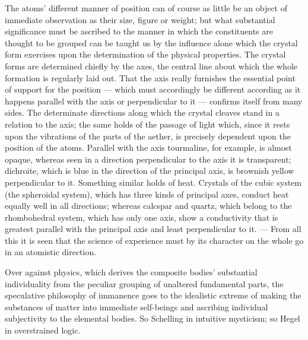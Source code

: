 \documentclass[12pt,a4paper]{book}
\begin{document}
The atoms' different manner of position can of course as little be an object of immediate observation as their size,
figure or weight; but what substantial significance must be ascribed to the manner in which the constituents are
thought to be grouped can be taught us by the influence alone which the crystal form exercises upon the determination
of the physical properties. The crystal forms are determined chiefly by the axes, the central line about which the
whole formation is regularly laid out. That the axis really furnishes the essential point of support for the position
--- which must accordingly be different according as it happens parallel with the axis or perpendicular to it ---
confirms itself from many sides. The determinate directions along which the crystal cleaves stand in a relation to the
axis; the same holds of the passage of light which, since it rests upon the vibrations of the parts of the aether, is
precisely dependent upon
the position of the atoms. Parallel with the axis tourmaline, for example, is almost opaque, whereas seen in a
direction perpendicular to the axis it is transparent; dichroite, which is blue in the direction of the principal
axis, is brownish yellow perpendicular to it. Something similar holds of heat. Crystals of the cubic system (the
spheroidal system), which has three kinds of principal axes, conduct heat equally well in all directions; whereas
calcspar and quartz, which belong to the rhombohedral system, which has only one axis, show a conductivity that is
greatest parallel with the principal axis and least perpendicular to it. --- From all this it is seen that the science
of experience must by its character on the whole go in an atomistic direction.

Over against physics, which derives the composite bodies' substantial individuality from the peculiar grouping of
unaltered fundamental parts, the speculative philosophy of immanence goes to the idealistic extreme of making the
substances of matter into immediate self-beings and ascribing individual subjectivity to the elemental bodies. So
Schelling in intuitive mysticism; so Hegel in overstrained logic.
\end{document}

